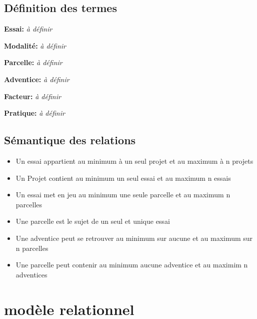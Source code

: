 \documentclass{article}
\begin{document}
\subsection{Définition des termes}

\textbf{Essai:} \textit{à définir} 

\textbf{Modalité:} \textit{à définir}

\textbf{Parcelle:} \textit{à définir}

\textbf{Adventice:} \textit{à définir}

\textbf{Facteur:} \textit{à définir}

\textbf{Pratique:} \textit{à définir}


\subsection{Sémantique des relations}
\begin{itemize}
  \item Un essai appartient au minimum à un seul projet et au maximum à n projets 
  \item Un Projet contient au minimum un seul essai et au maximum n essais
  \item Un essai met en jeu au minimum une seule parcelle et au maximum n parcelles
  \item Une parcelle est le sujet de un seul et unique essai
  \item Une adventice peut se retrouver au minimum sur aucune et au maximum sur n parcelles
  \item Une parcelle peut contenir au minimum aucune adventice et au maximim n adventices
  
\end{itemize}


\section{modèle relationnel}
\end{document}
